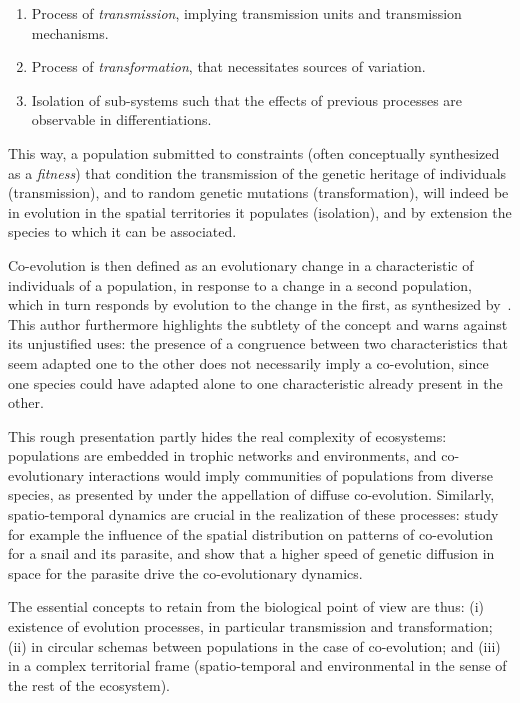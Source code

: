 \documentclass[letterpaper]{article}
\begin{document}
\begin{enumerate}
\item Process of \emph{transmission}, implying transmission units and transmission mechanisms.
\item Process of \emph{transformation}, that necessitates sources of variation.
\item Isolation of sub-systems such that the effects of previous processes are observable in differentiations.
\end{enumerate}

This way, a population submitted to constraints (often conceptually synthesized as a \emph{fitness}) that condition the transmission of the genetic heritage of individuals (transmission), and to random genetic mutations (transformation), will indeed be in evolution in the spatial territories it populates (isolation), and by extension the species to which it can be associated. 

Co-evolution is then defined as an evolutionary change in a characteristic of individuals of a population, in response to a change in a second population, which in turn responds by evolution to the change in the first, as synthesized by~\cite{janzen1980coevolution}. This author furthermore highlights the subtlety of the concept and warns against its unjustified uses: the presence of a congruence between two characteristics that seem adapted one to the other does not necessarily imply a co-evolution, since one species could have adapted alone to one characteristic already present in the other.

This rough presentation partly hides the real complexity of ecosystems: populations are embedded in trophic networks and environments, and co-evolutionary interactions would imply communities of populations from diverse species, as presented by \cite{strauss2005toward} under the appellation of diffuse co-evolution. Similarly, spatio-temporal dynamics are crucial in the realization of these processes: \cite{dybdahl1996geography} study for example the influence of the spatial distribution on patterns of co-evolution for a snail and its parasite, and show that a higher speed of genetic diffusion in space for the parasite drive the co-evolutionary dynamics.


The essential concepts to retain from the biological point of view are thus: (i) existence of evolution processes, in particular transmission and transformation; (ii) in circular schemas between populations in the case of co-evolution; and (iii) in a complex territorial frame (spatio-temporal and environmental in the sense of the rest of the ecosystem).
\end{document}
